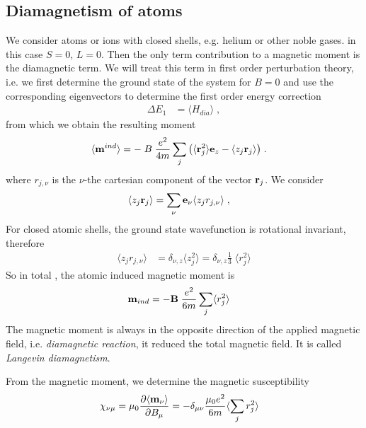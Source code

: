 \subsection{Diamagnetism of atoms}
We consider atoms or ions with closed shells, e.g. helium or other noble gases. in this case
$S=0$, $L=0$. Then the only term contribution to a magnetic moment is the diamagnetic term.
We will treat this term in first order perturbation theory, i.e. we first determine the ground state
of the system for $B=0$ and use the corresponding eigenvectors to determine the first order energy correction
%
\begin{align*}
\Delta E_{1} &= \langle H_{dia} \rangle\;,
\end{align*}
%
from which we obtain the resulting moment
%
\begin{align*}
\langle  \mathbf m^{ind}\rangle &=-\;
B\;\frac{e^{2} }{4 m} \sum_{j} \big( \langle \mathbf r_{j}^{2}\rangle 
\mathbf e_{z} - \langle z_{j} \mathbf r_{j}\rangle \big)\;.
\end{align*}
%
where $r_{j,\nu}$ is the $\nu$-the cartesian component  of the vector
$\mathbf r_{j}$. We consider
%
\begin{align*}
\langle z_{j} \mathbf r_{j} \rangle &=\sum_{\nu} \mathbf e_{\nu}
\langle z_{j} r_{j,\nu}\rangle\;,
\end{align*}
%
For closed atomic shells, the ground state wavefunction is rotational invariant, therefore 
%
\begin{align*}
\langle z_{j} r_{j,\nu}\rangle &= \delta_{\nu,z}\langle z_{j}^{2}\rangle = \delta_{\nu,z}\frac{1}{3}\;\langle r_{j}^{2}\rangle
\end{align*}
%
So in total , the atomic induced magnetic moment is 
%
\begin{align*}
\mathbf m_{ind} &=-\mathbf B\;\frac{e^{2} }{6 m} \sum_{j} 
\langle r_{j}^{2} \rangle
\end{align*}
%
The magnetic moment is always in the opposite direction of the applied magnetic field,
i.e. {\em diamagnetic reaction}, it reduced the total magnetic field.
It is called {\em \color{blue} Langevin diamagnetism}. 

From the magnetic moment, we determine the magnetic susceptibility
%
\begin{align*}
\chi_{\nu\mu} &= \mu_{0}\frac{\partial\langle \mathbf m_{\nu} \rangle }{\partial B_{\mu}}
=-\delta_{\mu\nu} \frac{\mu_{0}e^{2}}{6m} \langle \sum_{j}r_{j}^{2} \rangle
\end{align*}
%


